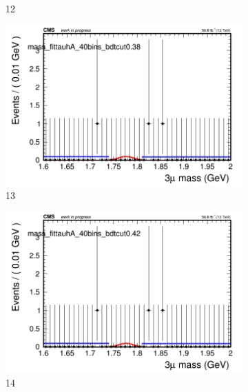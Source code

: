 \begin{figure}[h!]
\begin{subfigure}{0.2\textwidth}
        \caption{12}
    \end{subfigure}
    \begin{subfigure}{0.2\textwidth}
        \includegraphics[width=\textwidth]{unfixed_exp/plots/tauhA/massfit_tauhA_40bins_bdtcut0.38.png}
        \caption{13}
    \end{subfigure}
    \begin{subfigure}{0.2\textwidth}
        \includegraphics[width=\textwidth]{unfixed_exp/plots/tauhA/massfit_tauhA_40bins_bdtcut0.42.png}
        \caption{14}
    \end{subfigure}
    \begin{subfigure}{0.2\textwidth}

\end{subfigure}
\end{figure}
